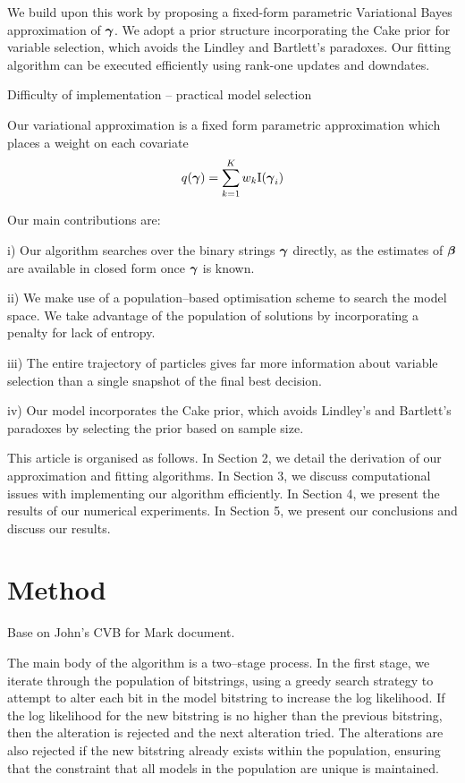 \documentclass{amsart}[12pt]
\begin{document}
We build upon this work by proposing a fixed-form parametric Variational Bayes approximation of ${\boldsymbol \gamma}$.
We adopt a prior structure incorporating the Cake prior for variable selection, which avoids the Lindley
and Bartlett's paradoxes.
Our fitting algorithm can be executed efficiently using rank-one updates and downdates.

Difficulty of implementation -- practical model selection
\cite{Chipman2014}

Our variational approximation is a fixed form parametric approximation which places a weight on each covariate
\[
	q({\boldsymbol \gamma}) = \sum_{k=1}^K w_k \text{I}({\boldsymbol \gamma}_i)
\]


Our main contributions are:

i) Our algorithm searches over the binary strings ${\boldsymbol \gamma}$ directly, as the estimates of ${\boldsymbol \beta}$ are available 
in closed form once ${\boldsymbol \gamma}$ is known.

ii) We make use of a population--based optimisation scheme to search the model space. We take advantage of the
population of solutions by incorporating a penalty for lack of entropy.

iii) The entire trajectory of particles gives far more information about variable selection than a single
snapshot of the final best decision.

iv) Our model incorporates the Cake prior, which avoids Lindley's and Bartlett's paradoxes by selecting the
prior based on sample size.

This article is organised as follows. In Section 2, we detail the derivation of our approximation and fitting
algorithms. In Section 3, we discuss computational issues with implementing our algorithm efficiently. In
Section 4, we present the results of our numerical experiments. In Section 5, we present our conclusions and
discuss our results.

\section{Method}

Base on John's CVB for Mark document.

The main body of the algorithm is a two--stage process. In the first stage, we iterate through the population of
bitstrings, using a greedy search strategy to attempt to alter each bit in the model bitstring to increase the log likelihood. If the log likelihood for the new bitstring is no higher than the previous bitstring, then the
alteration is rejected and the next alteration tried. The alterations are also rejected if the new bitstring
already exists within the population, ensuring that the constraint that all models in the population are
unique is maintained.
\end{document}
